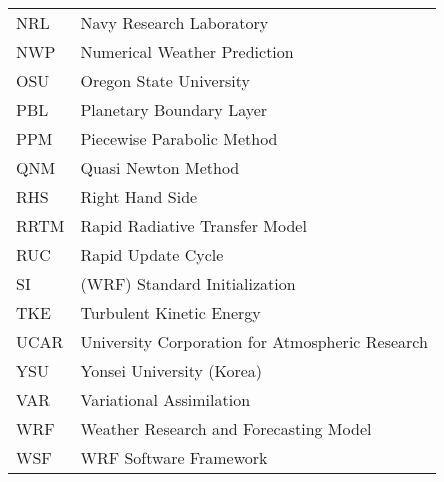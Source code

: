 \newpage
\normalsize
\begin{tabular}[t]{ll}
NRL & Navy Research Laboratory \\
NWP & Numerical Weather Prediction \\
OSU & Oregon State University \\
PBL & Planetary Boundary Layer \\
PPM & Piecewise Parabolic Method \\
QNM & Quasi Newton Method \\
RHS & Right Hand Side \\
RRTM & Rapid Radiative Transfer Model \\
RUC & Rapid Update Cycle \\
SI & (WRF) Standard Initialization\\
TKE & Turbulent Kinetic Energy \\
UCAR & University Corporation for Atmospheric Research \\
YSU & Yonsei University (Korea) \\
VAR & Variational Assimilation \\
WRF & Weather Research and Forecasting Model \\
WSF & WRF Software Framework \\
\end{tabular}
